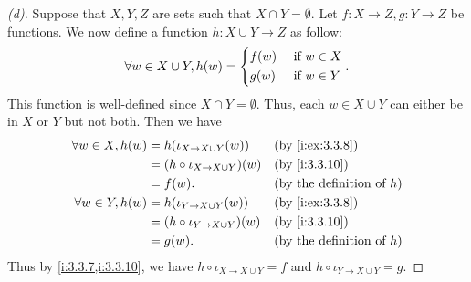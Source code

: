 \begin{proof}[(d)]
  Suppose that \(X, Y, Z\) are sets such that \(X \cap Y = \emptyset\).
  Let \(f : X \to Z, g : Y \to Z\) be functions.
  We now define a function \(h : X \cup Y \to Z\) as follow:
  \[
    \forall w \in X \cup Y, h(w) = \begin{dcases}
      f(w) & \text{ if } w \in X \\
      g(w) & \text{ if } w \in Y
    \end{dcases}.
  \]
  This function is well-defined since \(X \cap Y = \emptyset\).
  Thus, each \(w \in X \cup Y\) can either be in \(X\) or \(Y\) but not both.
  Then we have
  \begin{align*}
    \forall w \in X, h(w) & = h(\iota_{X \to X \cup Y}(w))        &  & \by{i:ex:3.3.8}                     \\
                          & = (h \circ \iota_{X \to X \cup Y})(w) &  & \by{i:3.3.10}                       \\
                          & = f(w).                               &  & \text{(by the definition of \(h\))} \\
    \forall w \in Y, h(w) & = h(\iota_{Y \to X \cup Y}(w))        &  & \by{i:ex:3.3.8}                     \\
                          & = (h \circ \iota_{Y \to X \cup Y})(w) &  & \by{i:3.3.10}                       \\
                          & = g(w).                               &  & \text{(by the definition of \(h\))}
  \end{align*}
  Thus by \cref{i:3.3.7,i:3.3.10}, we have \(h \circ \iota_{X \to X \cup Y} = f\) and \(h \circ \iota_{Y \to X \cup Y} = g\).


\end{proof}
